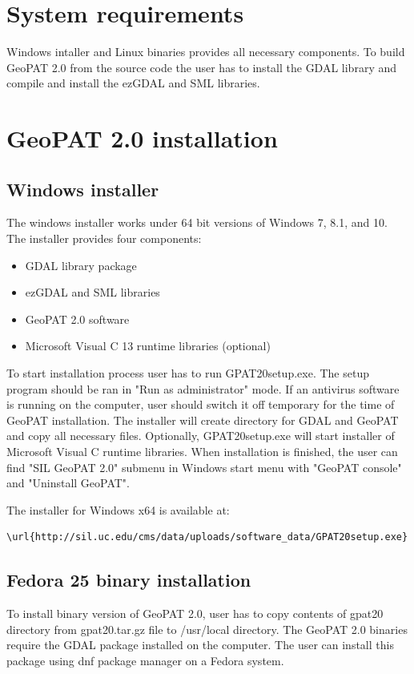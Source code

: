 \documentclass[12pt,margin=0.5in]{article}
\begin{document}
\begin{appendices}

\section{System requirements}
Windows intaller and Linux binaries provides all necessary components. 
To build GeoPAT 2.0 from the source code the user has to install the GDAL library and compile and install the ezGDAL and SML libraries.

\section{GeoPAT 2.0 installation}

\subsection{Windows installer}
The windows installer works under 64 bit versions of Windows 7, 8.1, and 10.
The installer provides four components:
\begin{itemize}
  \item{GDAL library package}
  \item{ezGDAL and SML libraries}
  \item{GeoPAT 2.0 software}
  \item{Microsoft Visual C 13 runtime libraries (optional)}
\end{itemize}
To start installation process user has to run GPAT20setup.exe.
The setup program should be ran in "Run as administrator" mode.
If an antivirus software is running on the computer, user should 
switch it off temporary for the time of GeoPAT installation.
The installer will create directory for GDAL and GeoPAT and 
copy all necessary files. Optionally, GPAT20setup.exe will
start installer of Microsoft Visual C runtime libraries.
When installation is finished, the user can find "SIL GeoPAT 2.0"
submenu in Windows start menu with "GeoPAT console" and "Uninstall GeoPAT".

The installer for Windows x64 is available at:

\begin{lstlisting}[frame=single]
\url{http://sil.uc.edu/cms/data/uploads/software_data/GPAT20setup.exe}
\end{lstlisting}

\subsection{Fedora 25 binary installation}
To install binary version of GeoPAT 2.0, user has to copy contents
of gpat20 directory from gpat20.tar.gz file to /usr/local directory.
The GeoPAT 2.0 binaries require the GDAL package installed on the computer.
The user can install this package using dnf package manager on a Fedora system.


\end{appendices}
\end{document}
